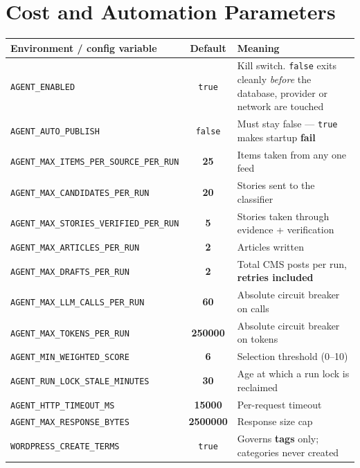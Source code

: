 \documentclass[10pt,a4paper]{article}
\newcommand{\vr}[1]{\texttt{\footnotesize\hyphenpenalty=0\exhyphenpenalty=0\relax #1}}
\newcommand{\cd}[1]{\texttt{\footnotesize\hyphenpenalty=0\exhyphenpenalty=0\relax #1}}
\newcommand{\us}{\_\discretionary{}{}{}}
\begin{document}
\section{Cost and Automation Parameters}

\begin{center}\footnotesize
\begin{tabularx}{\textwidth}{@{}>{\RaggedRight}p{6.0cm} c >{\RaggedRight}X@{}}
\toprule
\textbf{Environment / config variable} & \textbf{Default} & \textbf{Meaning} \\
\midrule
\vr{AGENT\us ENABLED} & \cd{true} & Kill switch. \cd{false} exits cleanly \emph{before} the database, provider or network are touched \\
\vr{AGENT\us AUTO\us PUBLISH} & \cd{false} & Must stay false --- \cd{true} makes startup \textbf{fail} \\
\vr{AGENT\us MAX\us ITEMS\us PER\us SOURCE\us PER\us RUN} & \textbf{25} & Items taken from any one feed \\
\vr{AGENT\us MAX\us CANDIDATES\us PER\us RUN} & \textbf{20} & Stories sent to the classifier \\
\vr{AGENT\us MAX\us STORIES\us VERIFIED\us PER\us RUN} & \textbf{5} & Stories taken through evidence + verification \\
\vr{AGENT\us MAX\us ARTICLES\us PER\us RUN} & \textbf{2} & Articles written \\
\vr{AGENT\us MAX\us DRAFTS\us PER\us RUN} & \textbf{2} & Total CMS posts per run, \textbf{retries included} \\
\vr{AGENT\us MAX\us LLM\us CALLS\us PER\us RUN} & \textbf{60} & Absolute circuit breaker on calls \\
\vr{AGENT\us MAX\us TOKENS\us PER\us RUN} & \textbf{250000} & Absolute circuit breaker on tokens \\
\vr{AGENT\us MIN\us WEIGHTED\us SCORE} & \textbf{6} & Selection threshold (0--10) \\
\vr{AGENT\us RUN\us LOCK\us STALE\us MINUTES} & \textbf{30} & Age at which a run lock is reclaimed \\
\vr{AGENT\us HTTP\us TIMEOUT\us MS} & \textbf{15000} & Per-request timeout \\
\vr{AGENT\us MAX\us RESPONSE\us BYTES} & \textbf{2500000} & Response size cap \\
\vr{WORDPRESS\us CREATE\us TERMS} & \cd{true} & Governs \textbf{tags} only; categories never created \\

\end{tabularx}
\end{center}
\end{document}
